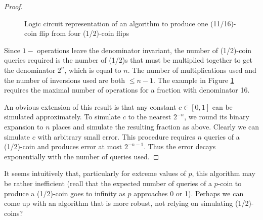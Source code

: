 \documentclass{article}
\theoremstyle{definition}
\begin{document}
\begin{proof}
\begin{figure}
\caption{Logic circuit representation of an algorithm to produce one (11/16)-coin flip from four (1/2)-coin flips}\label{fig:const_circuit}
\end{figure}

Since $1-$ operations leave the denominator invariant, the number of (1/2)-coin queries required is the number of (1/2)s that must be multiplied together to get the denominator $2^n$, which is equal to $n$.
The number of multiplications used and the number of inversions used are both $\leq n-1$. The example in Figure \ref{fig:const_circuit} requires the maximal number of operations for a fraction with denominator 16.

An obvious extension of this result is that any constant $c \in [0,1]$ can be simulated approximately. To simulate $c$ to the nearest $2^{-n}$, we round its binary expansion to $n$ places and simulate the resulting fraction as above. Clearly we can simulate $c$ with arbitrary small error. This procedure requires $n$ queries of a (1/2)-coin and produces error at most $2^{-n-1}$. Thus the error decays exponentially with the number of queries used.
\end{proof}

It seems intuitively that, particularly for extreme values of $p$, this algorithm may be rather inefficient (reall that the expected number of queries of a $p$-coin to produce a (1/2)-coin goes to infinity as $p$ approaches 0 or 1). Perhaps we can come up with an algorithm that is more robust, not relying on simulating (1/2)-coins?
\end{document}
